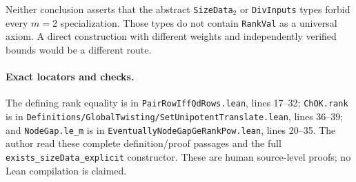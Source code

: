 Neither conclusion asserts that the abstract \texttt{SizeData$_2$}
or \texttt{DivInputs} types forbid every $m=2$ specialization.
Those types do not contain \texttt{RankVal} as a universal axiom.
A direct construction with different weights and independently
verified bounds would be a different route.

\paragraph{Exact locators and checks.}
The defining rank equality is in
\texttt{PairRowIffQdRows.lean}, lines 17--32;
\texttt{ChOK.rank} is in
\texttt{Definitions/GlobalTwisting/SetUnipotentTranslate.lean},
lines 36--39; and \texttt{NodeGap.le\_m} is in
\texttt{EventuallyNodeGapGeRankPow.lean}, lines 20--35.
The author read these complete definition/proof passages and the
full \texttt{exists\_sizeData\_explicit} constructor.  These are
human source-level proofs; no Lean compilation is claimed.
